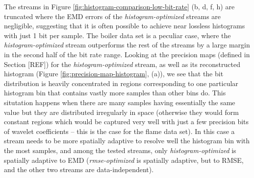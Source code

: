 The streams in Figure \ref{fig:histogram-comparison-low-bit-rate} (b, d, f, h) are truncated where
the EMD errors of the \emph{histogram-optimized} streams are negligible, suggesting that it is often
possible to achieve near lossless histograms with just 1 bit per sample. The boiler data set is a
peculiar case, where the \emph{histogram-optimized} stream outperforms the rest of the streams by a
large margin in the second half of the bit rate range. Looking at the precision maps (defined in
Section [REF]) for the \emph{histogram-optimized} stream, as well as its reconstructed histogram
(Figure \ref{fig:precision-map-histogram}, (a)), we see that the bit distribution is heavily
concentrated in regions corresponding to one particular histogram bin that contains vastly more
samples than other bins do. This situtation happens when there are many samples having essentially
the same value but they are distributed irregularly in space (otherwise they would form constant
regions which would be captured very well with just a few precision bits of wavelet coefficients --
this is the case for the flame data set). In this case a stream needs to be more spatially adaptive
to resolve well the histogram bin with the most samples, and among the tested streams, only
\emph{histogram-optimized} is spatially adaptive to EMD (\emph{rmse-optimized} is spatially
adaptive, but to RMSE, and the other two streams are data-independent).


